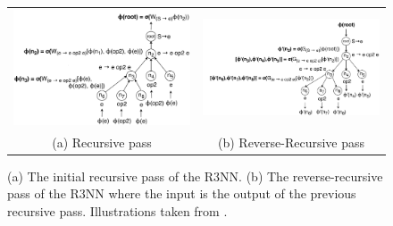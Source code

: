 \documentclass{article} %
\begin{document}
\vspace{-10pt}
\begin{figure}[h]
    \begin{tabular}{cc}
        \begin{minipage}{0.45\linewidth}
            \includegraphics[scale=0.16]{figures/tree2.png}
        \end{minipage}
        &
        \begin{minipage}{0.55\linewidth}
            \includegraphics[scale=0.16]{figures/tree3.png}
        \end{minipage}
        \\
        (a) Recursive pass & (b) Reverse-Recursive pass
    \end{tabular}
    \caption{(a) The initial recursive pass of the R3NN. (b) The reverse-recursive pass of the R3NN where the input is the output of the previous recursive pass. Illustrations taken from \citep{nsps}.}
    \label{r3nn}
    \vspace{-10pt}
\end{figure}
\vspace{-10pt}
\end{document}
